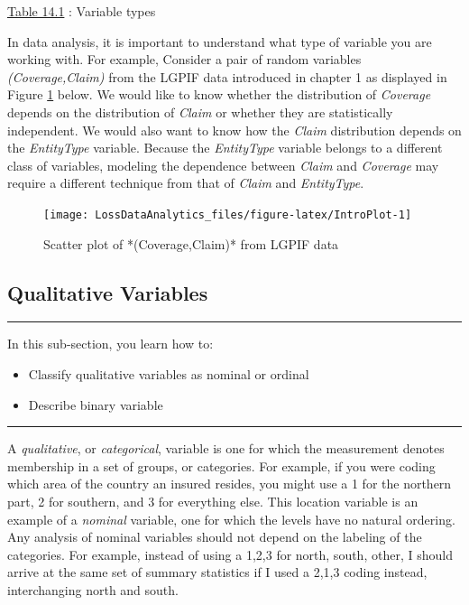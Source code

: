 \documentclass[]{book}
\providecommand{\tightlist}{%
  \setlength{\itemsep}{0pt}\setlength{\parskip}{0pt}}
\theoremstyle{definition}
\theoremstyle{definition}
\theoremstyle{definition}
\theoremstyle{remark}
\begin{document}
\protect\hyperlink{tab:14.1}{Table 14.1} : Variable types

In data analysis, it is important to understand what type of variable
you are working with. For example, Consider a pair of random variables
\emph{(Coverage,Claim)} from the LGPIF data introduced in chapter 1 as
displayed in Figure \ref{fig:IntroPlot} below. We would like to know
whether the distribution of \emph{Coverage} depends on the distribution
of \emph{Claim} or whether they are statistically independent. We would
also want to know how the \emph{Claim} distribution depends on the
\emph{EntityType} variable. Because the \emph{EntityType} variable
belongs to a different class of variables, modeling the dependence
between \emph{Claim} and \emph{Coverage} may require a different
technique from that of \emph{Claim} and \emph{EntityType}.

\begin{figure}

{\centering \texttt{[image: LossDataAnalytics\_files/figure-latex/IntroPlot-1]} 

}

\caption{Scatter plot of *(Coverage,Claim)* from LGPIF data}\label{fig:IntroPlot}
\end{figure}

\subsection{Qualitative Variables}\label{S:QuaVar}

\begin{center}\rule{0.5\linewidth}{\linethickness}\end{center}

In this sub-section, you learn how to:

\begin{itemize}
\tightlist
\item
  Classify qualitative variables as nominal or ordinal
\item
  Describe binary variable
\end{itemize}

\begin{center}\rule{0.5\linewidth}{\linethickness}\end{center}

A \emph{qualitative}, or \emph{categorical}, variable is one for which
the measurement denotes membership in a set of groups, or categories.
For example, if you were coding which area of the country an insured
resides, you might use a 1 for the northern part, 2 for southern, and 3
for everything else. This location variable is an example of a
\emph{nominal} variable, one for which the levels have no natural
ordering. Any analysis of nominal variables should not depend on the
labeling of the categories. For example, instead of using a 1,2,3 for
north, south, other, I should arrive at the same set of summary
statistics if I used a 2,1,3 coding instead, interchanging north and
south.
\end{document}
